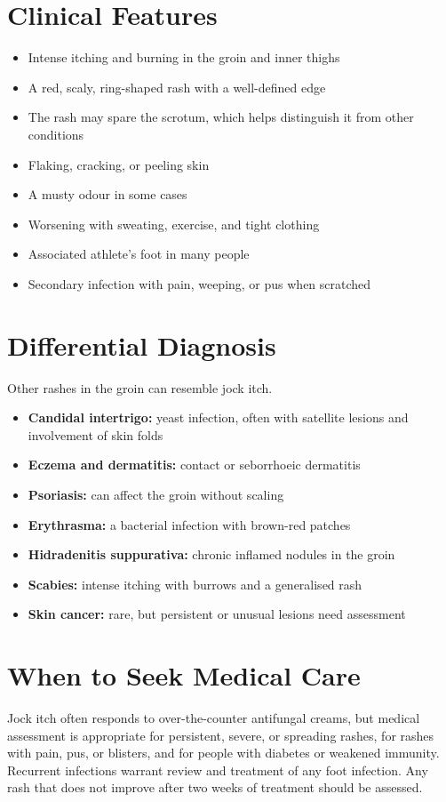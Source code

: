 \section*{Clinical Features}
\begin{itemize}
    \item Intense itching and burning in the groin and inner thighs
    \item A red, scaly, ring-shaped rash with a well-defined edge
    \item The rash may spare the scrotum, which helps distinguish it from other conditions
    \item Flaking, cracking, or peeling skin
    \item A musty odour in some cases
    \item Worsening with sweating, exercise, and tight clothing
    \item Associated athlete's foot in many people
    \item Secondary infection with pain, weeping, or pus when scratched
\end{itemize}

\section*{Differential Diagnosis}
Other rashes in the groin can resemble jock itch.
\begin{itemize}
    \item \textbf{Candidal intertrigo:} yeast infection, often with satellite lesions and involvement of skin folds
    \item \textbf{Eczema and dermatitis:} contact or seborrhoeic dermatitis
    \item \textbf{Psoriasis:} can affect the groin without scaling
    \item \textbf{Erythrasma:} a bacterial infection with brown-red patches
    \item \textbf{Hidradenitis suppurativa:} chronic inflamed nodules in the groin
    \item \textbf{Scabies:} intense itching with burrows and a generalised rash
    \item \textbf{Skin cancer:} rare, but persistent or unusual lesions need assessment
\end{itemize}

\section*{When to Seek Medical Care}
Jock itch often responds to over-the-counter antifungal creams, but medical assessment is appropriate for persistent, severe, or spreading rashes, for rashes with pain, pus, or blisters, and for people with diabetes or weakened immunity. Recurrent infections warrant review and treatment of any foot infection. Any rash that does not improve after two weeks of treatment should be assessed.

